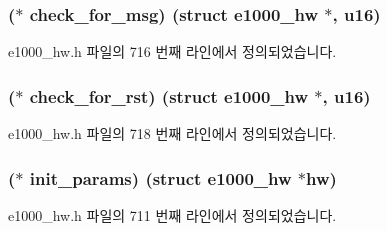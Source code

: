 \subsubsection[{\texorpdfstring{check\+\_\+for\+\_\+msg}{check_for_msg}}]{($\ast$ check\+\_\+for\+\_\+msg) (struct {\bf e1000\+\_\+hw} $\ast$, {\bf u16})}\hypertarget{structe1000__mbx__operations_a5574b564ba8d1dbfd72f6a98f1a30ee8}{}\label{structe1000__mbx__operations_a5574b564ba8d1dbfd72f6a98f1a30ee8}


e1000\+\_\+hw.\+h 파일의 716 번째 라인에서 정의되었습니다.

\subsubsection[{\texorpdfstring{check\+\_\+for\+\_\+rst}{check_for_rst}}]{($\ast$ check\+\_\+for\+\_\+rst) (struct {\bf e1000\+\_\+hw} $\ast$, {\bf u16})}\hypertarget{structe1000__mbx__operations_a0a41fd1de41d0c29fa2e8c833c39055e}{}\label{structe1000__mbx__operations_a0a41fd1de41d0c29fa2e8c833c39055e}


e1000\+\_\+hw.\+h 파일의 718 번째 라인에서 정의되었습니다.

\subsubsection[{\texorpdfstring{init\+\_\+params}{init_params}}]{($\ast$ init\+\_\+params) (struct {\bf e1000\+\_\+hw} $\ast$hw)}\hypertarget{structe1000__mbx__operations_a6feb50322fe43db6af988c77576d925c}{}\label{structe1000__mbx__operations_a6feb50322fe43db6af988c77576d925c}


e1000\+\_\+hw.\+h 파일의 711 번째 라인에서 정의되었습니다.

